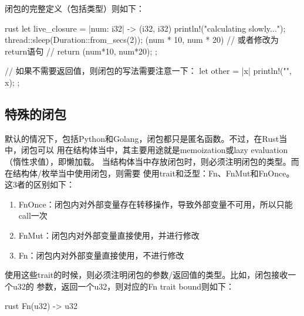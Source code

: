 闭包的完整定义（包括类型）则如下：
\begin{code-block}{rust}
let live_closure = |num: i32| -> (i32, i32) {
    println!("calculating slowly...");
    thread::sleep(Duration::from_secs(2));
    (num * 10, num * 20)
    // 或者修改为return语句
    // return (num*10, num*20);
};

// 如果不需要返回值，则闭包的写法需要注意一下：
let other = |x| {
    println!("{}", x);
};
\end{code-block}

\subsection{特殊的闭包}
默认的情况下，包括Python和Golang，闭包都只是匿名函数。不过，在Rust当中，闭包可以
用在结构体当中，其主要用途就是memoization或lazy evaluation（惰性求值），即懒加载。
当结构体当中存放闭包时，则必须注明闭包的类型。而在结构体/枚举当中使用闭包，则需要
使用trait和泛型：Fn、FnMut和FnOnce。这3者的区别如下：
\begin{enumerate}
  \item FnOnce：闭包内对外部变量存在转移操作，导致外部变量不可用，所以只能call一次
  \item FnMut：闭包内对外部变量直接使用，并进行修改
  \item Fn：闭包内对外部变量直接使用，不进行修改
\end{enumerate}

使用这些trait的时候，则必须注明闭包的参数/返回值的类型。比如，闭包接收一个u32的
参数，返回一个u32，则对应的Fn trait bound则如下：
\begin{code-block}{rust}
Fn(u32) -> u32
\end{code-block}


